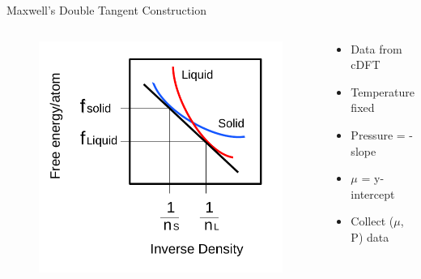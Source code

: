 \documentclass{beamer}
\begin{document}
\begin{frame}{Maxwell's Double Tangent Construction}
	\begin{columns}[t]
        \begin{figure}
            \centering
            \includegraphics[width=\columnwidth]{figs/MaxwellDTC-Fig1.pdf}
          \end{figure}
		\begin{block}{}
			\begin{itemize}
				\item Data from cDFT 
				\item Temperature fixed
				\item Pressure = -slope
				\item $\mu$ = y-intercept
				\item Collect ($\mu$, P) data
			\end{itemize}
	    \end{block}
	\end{columns}	
\end{frame}
\end{document}
